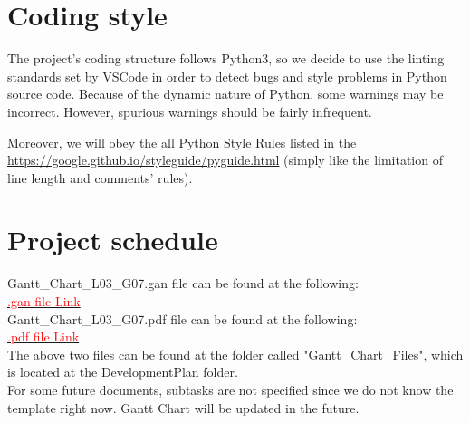 \documentclass[12pt]{article}
\begin{document}
\section{Coding style}
The project’s coding structure follows Python3, so we decide to use the linting standards set by VSCode in order to detect bugs and style problems in Python source code. Because of the dynamic nature of Python, some warnings may be incorrect. However, spurious warnings should be fairly infrequent. 

\noindent Moreover, we will obey the all Python Style Rules listed in the \url{https://google.github.io/styleguide/pyguide.html} (simply like the limitation of line length and comments’ rules).

\section{Project schedule}
Gantt\_Chart\_L03\_G07.gan file can be found at the following:\\ 
\href{https://gitlab.cas.mcmaster.ca/shit19/2022_winter_3xa3_l03_g07/-/blob/main/ProjectSchedule/Gantt_Chart_L03_G07.gan}{\textcolor{red}{.gan file Link}}\\

\noindent Gantt\_Chart\_L03\_G07.pdf file can be found at the following:\\ \href{https://gitlab.cas.mcmaster.ca/shit19/2022_winter_3xa3_l03_g07/-/blob/main/ProjectSchedule/Gantt_Chart_L03_G07.pdf}{\textcolor{red}{.pdf file Link}}\\

\noindent The above two files can be found at 
the folder called "Gantt\_Chart\_Files", which
is located at the DevelopmentPlan folder.\\
For some future documents, subtasks are not 
specified since we do not know the template 
right now. Gantt Chart will be updated in the 
future.  
\end{document}
